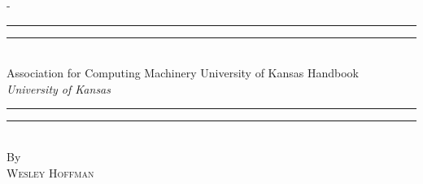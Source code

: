 %
%
%
%
%
\begin{titlingpage}
\begin{SingleSpace}
\calccentering{\unitlength}
\begin{adjustwidth*}{\unitlength}{-\unitlength}
\vspace*{13mm}
\begin{center}
\rule[0.5ex]{\linewidth}{2pt}\vspace*{-\baselineskip}\vspace*{3.2pt}
\rule[0.5ex]{\linewidth}{1pt}\\[\baselineskip]
{\HUGE Association for Computing Machinery University of Kansas Handbook }\\[4mm]
{\Large \textit{University of Kansas}}\\
\rule[0.5ex]{\linewidth}{1pt}\vspace*{-\baselineskip}\vspace{3.2pt}
\rule[0.5ex]{\linewidth}{2pt}\\
\vspace{6.5mm}
{\large By}\\
\vspace{6.5mm}
{\large\textsc{Wesley Hoffman}}\\
\vspace{11mm}

\end{center}
\end{adjustwidth*}
\end{SingleSpace}
\end{titlingpage}
